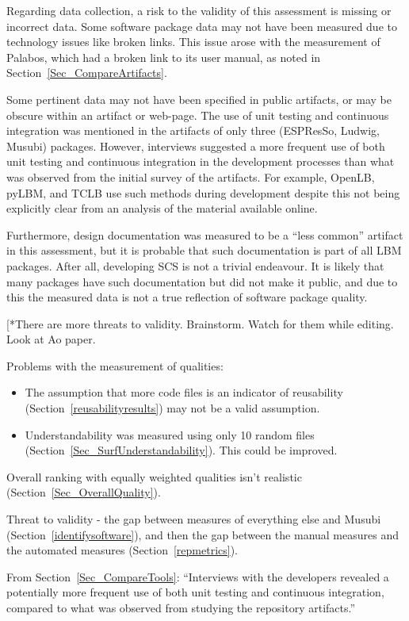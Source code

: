 \documentclass[runningheads]{llncs}
\begin{document}
Regarding data collection, a risk to the validity of this assessment is missing
or incorrect data. Some software package data may not have been measured due to
technology issues like broken links. This issue arose with the measurement of
Palabos, which had a broken link to its user manual, as noted in
Section~\ref{Sec_CompareArtifacts}. 

Some pertinent data may not have been specified in public artifacts, or may be
obscure within an artifact or web-page. The use of unit testing and continuous
integration was mentioned in the artifacts of only three (ESPResSo, Ludwig,
Musubi) packages. However, interviews suggested a more frequent use of both unit
testing and continuous integration in the development processes than what was
observed from the initial survey of the artifacts. For example, OpenLB, pyLBM,
and TCLB use such methods during development despite this not being explicitly
clear from an analysis of the material available online. 

Furthermore, design documentation was measured to be a ``less common'' artifact
in this assessment, but it is probable that such documentation is part of all
LBM packages. After all, developing SCS is not a trivial endeavour. It is likely
that many packages have such documentation but did not make it public, and due
to this the measured data is not a true reflection of software package quality.

[*{There are more threats to validity.  Brainstorm.  Watch for them while 
editing.  Look at Ao paper.}

Problems with the measurement of qualities:

\begin{itemize}
\item The assumption that more code files is an indicator of reusability
(Section~\ref{reusabilityresults}) may not be a valid assumption.
\item Understandability was measured using only 10 random files
(Section~\ref{Sec_SurfUnderstandability}).  This could be improved.
\end{itemize}

Overall ranking with equally weighted qualities isn't realistic
(Section~\ref{Sec_OverallQuality}).

Threat to validity - the gap between measures of everything else and Musubi
(Section~\ref{identifysoftware}), and then the gap between the manual measures
and the automated measures (Section~\ref{repmetrics}).

From Section~\ref{Sec_CompareTools}: ``Interviews with the developers revealed a
potentially more frequent use of both unit testing and continuous integration,
compared to what was observed from studying the repository artifacts.''
\end{document}

